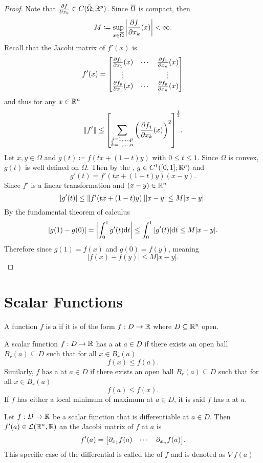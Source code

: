 \documentclass[../main.tex]{subfiles}
\begin{document}
\begin{proof}
    Note that $\pdv{f}{x_k} \in C(\tilde{\Omega}; \mathbb{R}^p)$. Since $\overline{\Omega}$ is compact, then
    \[
        M \coloneq \sup_{x \in \overline{\Omega}} \qty|\pdv{f}{x_k}\relax(x)| < \infty
    .\]
    Recall that the Jacobi matrix of $f'(x)$ is
    \[
        f'(x) = \mqty[
        \pdv{f_1}{x_1}\relax(x) & \cdots & \pdv{f_1}{x_n}\relax(x) \\
        \vdots                  &        & \vdots                  \\
        \pdv{f_p}{x_1}\relax(x) & \cdots & \pdv{f_p}{x_n}\relax(x) \\
        ]
    \]
    and thus for any $x \in \mathbb{R}^n$
    \[
        \norm{f'} \leq \qty[\sum_{\substack{j = 1, \ldots, p \\ k = 1, \ldots, n}} \qty(\pdv{f_j}{x_k}\relax(x))^2]^{\frac{1}{2}}
    .\]
    Let $x, y \in \Omega$ and $g(t) \coloneq f(tx + (1-t) y)$ with $0 \leq t \leq 1$. Since $\Omega$ is convex, $g(t)$ is well defined on $\Omega$. Then by the , $g \in C^1([0,1]; \mathbb{R}^p)$ and
    \[
        g'(t) = f'(tx + (1-t)y) (x-y)
    .\]
    Since $f'$ is a linear transformation and $(x-y) \in \mathbb{R}^n$
    \[
        |g'(t)| \leq \norm{f'(tx + (1-t)y)} |x - y| \leq M |x - y|
    .\]
    By the fundamental theorem of calculus
    \[
        |g(1) - g(0)| = \qty|\int_0^1 g'(t) \dd t| \leq \int_0^1 |g'(t)| \dd t \leq M |x-y|
    .\]
    Therefore since $g(1) = f(x)$ and $g(0) = f(y)$, meaning
    \[
        |f(x) - f(y)| \leq M |x-y|
    .\]
\end{proof}

\section{Scalar Functions}

\begin{definition}
    A function $f$ is a  if it is of the form $f : D \to \mathbb{R}$ where $D \subseteq \mathbb{R}^n$ open.
\end{definition}

\begin{definition}
    A scalar function $f : D \to \mathbb{R}$ has a  at $a \in D$ if there exists an open ball $B_r(a) \subseteq D$ such that for all $x \in B_r(a)$
    \[
        f(x) \leq f(a)
    .\]
    Similarly, $f$ has a  at $a \in D$ if there exists an open ball $B_r(a) \subseteq D$ such that for all $x \in B_r(a)$
    \[
        f(a) \leq f(x)
    .\]
    If $f$ has either a local minimum of maximum at $a \in D$, it is said $f$ has a  at $a$.
\end{definition}

\begin{remark}
    Let $f : D \to \mathbb{R}$ be a scalar function that is differentiable at $a \in D$. Then $f'(a) \in \mathcal{L}(\mathbb{R}^n,\mathbb{R})$ an the Jacobi matrix of $f$ at $a$ is
    \[
        f'(a) = \mqty[\partial_{x_1} f(a) & \cdots & \partial_{x_n} f(a)]
    .\]
    This specific case of the differential is called the  of $f$ and is denoted as $\nabla f(a)$
\end{remark}
\end{document}
